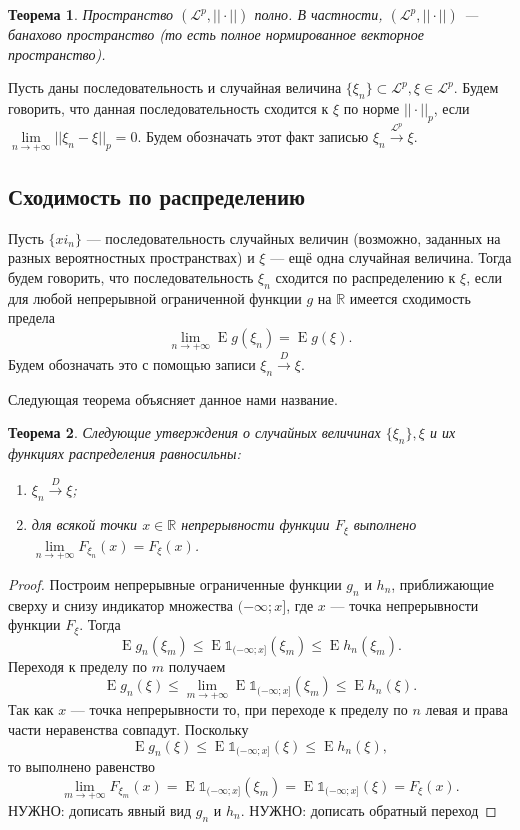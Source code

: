 \documentclass[12pt]{article}
\newtheorem{theorem}{Теорема}
\numberwithin{theorem}{section}
\theoremstyle{definition}
\newcommand{\defin}[2]{\hypertarget{#2}{{\color{red} #1}}}
\newcommand{\RR}{\mathbb{R}}
\newcommand{\expect}{\operatorname{E}}
\newcommand{\ind}{\mathds{1}}
\newcommand{\TODO}[1]{\textcolor{todocolor}{НУЖНО: #1}}
\begin{document}
	\begin{theorem}
		Пространство $ (\mathcal{L}^p, ||\cdot||) $ полно. В частности, $  (\mathcal{L}^p, ||\cdot||)  $
		--- банахово пространство (то есть полное нормированное векторное пространство).
	\end{theorem}
	
	Пусть даны последовательность и случайная величина $ \{\xi_n\} \subset \mathcal{L}^p, \xi \in \mathcal{L}^p $.
	Будем говорить, что данная последовательность \defin{сходится к $ \xi $ по норме $ ||\cdot||_p $}{in-normed-space},
	если $ \lim\limits_{n \to +\infty} ||\xi_n - \xi||_p = 0 $. 
	Будем обозначать этот факт записью $ \xi_n \overset{\mathcal{L}^p}{\to} \xi $.
	
	\subsection{Сходимость по распределению}
	
	Пусть $ \{xi_n\} $ --- последовательность случайных величин (возможно, заданных на разных вероятностных пространствах)
	и $ \xi $ --- ещё одна случайная величина.
	Тогда будем говорить, что последовательность $ \xi_n $ \defin{сходится по распределению}{in-distribution} к $ \xi $,
	если для любой непрерывной ограниченной функции $ g $ на $ \RR $ имеется сходимость предела
	$$ \lim\limits_{n \to +\infty} \expect g(\xi_n) = \expect g(\xi). $$
	Будем обозначать это с помощью записи $ \xi_n \overset{D}{\to} \xi $.
	
	Следующая теорема объясняет данное нами название.
	
	\begin{theorem}
		Следующие утверждения о случайных величинах $ \{\xi_n\}, \xi $
		и их функциях распределения равносильны:
		\begin{enumerate}
			\item $ \xi_n \overset{D}{\to} \xi $;
			\item для всякой точки $ x \in \RR $ непрерывности функции $ F_{\xi} $ 
			выполнено $ \lim\limits_{n \to +\infty} F_{\xi_n}(x) = F_{\xi}(x) $. 
		\end{enumerate}
	\end{theorem}
	
	\begin{proof}
		Построим непрерывные ограниченные 
		функции $ g_n $ и $ h_n $, приближающие сверху и снизу индикатор множества $ (-\infty; x] $,
		где $ x $ --- точка непрерывности функции $ F_\xi $.
		Тогда 
		$$ \expect g_n(\xi_m) \leqslant \expect \ind_{(-\infty; x]}(\xi_m) \leqslant \expect h_n(\xi_m). $$
		Переходя к пределу по $ m $ получаем
		$$ \expect g_n(\xi) \leqslant 
		 \lim\limits_{m \to +\infty} \expect\ind_{(-\infty; x]}(\xi_m)  \leqslant \expect h_n(\xi). $$
		Так как $ x $ --- точка непрерывности то, при переходе к пределу по $ n $ левая и права части неравенства совпадут.
		Поскольку
		$$ \expect g_n(\xi) \leqslant 
		\expect\ind_{(-\infty; x]}(\xi)  \leqslant \expect h_n(\xi), $$
		то выполнено равенство 
		$$  \lim\limits_{m \to +\infty} F_{\xi_m}(x) 
		= \expect\ind_{(-\infty; x]}(\xi_m) = \expect\ind_{(-\infty; x]}(\xi) = F_\xi(x). $$
		\TODO{дописать явный вид $ g_n $ и $ h_n $}.
		\TODO{дописать обратный переход}
	\end{proof}
	
\end{document}
